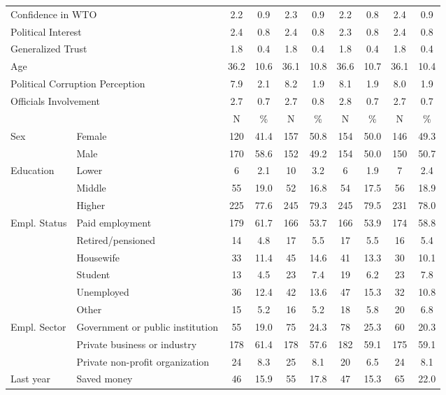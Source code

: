 \documentclass[11pt, ngerman,english,a4]{article}
\begin{document}
\begin{table}[!htbp]
{\begin{tabular}[t]{llcccccccc}
\multicolumn{2}{l}{Confidence in WTO} & 2.2 & 0.9 & 2.3 & 0.9 & 2.2 & 0.8 & 2.4 & 0.9\\
\multicolumn{2}{l}{Political Interest }  & 2.4 & 0.8 & 2.4 & 0.8 & 2.3 & 0.8 & 2.4 & 0.8\\
\multicolumn{2}{l}{Generalized Trust }  & 1.8 & 0.4 & 1.8 & 0.4 & 1.8 & 0.4 & 1.8 & 0.4\\
\multicolumn{2}{l}{Age }  & 36.2 & 10.6 & 36.1 & 10.8 & 36.6 & 10.7 & 36.1 & 10.4\\
\multicolumn{2}{l}{Political Corruption Perception }   & 7.9 & 2.1 & 8.2 & 1.9 & 8.1 & 1.9 & 8.0 & 1.9\\
\multicolumn{2}{l}{Officials Involvement }   & 2.7 & 0.7 & 2.7 & 0.8 & 2.8 & 0.7 & 2.7 & 0.7\\
\midrule
 &  & N & \% & N & \% & N & \% & N & \%\\
\cmidrule(l{1pt}r{3pt}){3-10}
Sex &  Female & 120 & 41.4 & 157 & 50.8 & 154 & 50.0 & 146 & 49.3\\
 & Male & 170 & 58.6 & 152 & 49.2 & 154 & 50.0 & 150 & 50.7\\
Education & Lower & 6 & 2.1 & 10 & 3.2 & 6 & 1.9 & 7 & 2.4\\
 & Middle & 55 & 19.0 & 52 & 16.8 & 54 & 17.5 & 56 & 18.9\\
 & Higher & 225 & 77.6 & 245 & 79.3 & 245 & 79.5 & 231 & 78.0\\
Empl. Status & Paid employment & 179 & 61.7 & 166 & 53.7 & 166 & 53.9 & 174 & 58.8\\
 & Retired/pensioned & 14 & 4.8 & 17 & 5.5 & 17 & 5.5 & 16 & 5.4\\
 & Housewife & 33 & 11.4 & 45 & 14.6 & 41 & 13.3 & 30 & 10.1\\
 & Student & 13 & 4.5 & 23 & 7.4 & 19 & 6.2 & 23 & 7.8\\
 & Unemployed & 36 & 12.4 & 42 & 13.6 & 47 & 15.3 & 32 & 10.8\\
 & Other & 15 & 5.2 & 16 & 5.2 & 18 & 5.8 & 20 & 6.8\\
Empl. Sector & Government or public institution & 55 & 19.0 & 75 & 24.3 & 78 & 25.3 & 60 & 20.3\\
 & Private business or industry & 178 & 61.4 & 178 & 57.6 & 182 & 59.1 & 175 & 59.1\\
 & Private non-profit organization & 24 & 8.3 & 25 & 8.1 & 20 & 6.5 & 24 & 8.1\\
Last year & Saved money & 46 & 15.9 & 55 & 17.8 & 47 & 15.3 & 65 & 22.0\\

\end{tabular}}
\end{table}
\end{document}
